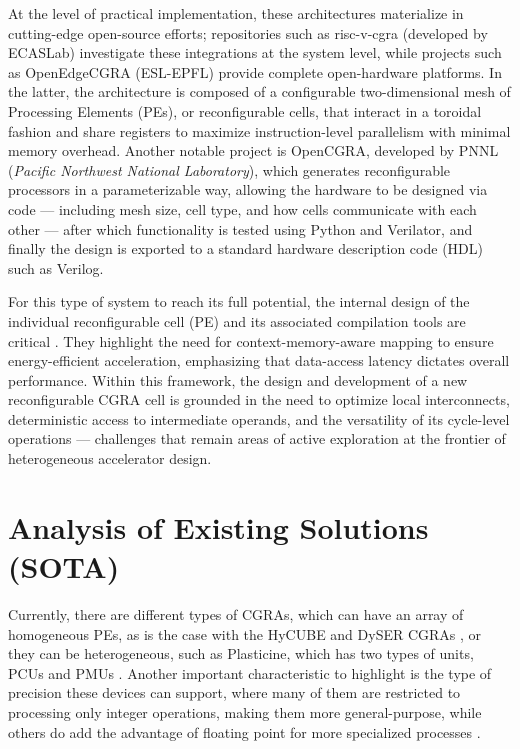 \documentclass[conference]{IEEEtran}
\begin{document}
At the level of practical implementation, these architectures materialize in cutting-edge open-source efforts; repositories such as risc-v-cgra (developed by ECASLab) investigate these integrations at the system level, while projects such as OpenEdgeCGRA (ESL-EPFL) provide complete open-hardware platforms. In the latter, the architecture is composed of a configurable two-dimensional mesh of Processing Elements (PEs), or reconfigurable cells, that interact in a toroidal fashion and share registers to maximize instruction-level parallelism with minimal memory overhead. Another notable project is OpenCGRA, developed by PNNL (\textit{Pacific Northwest National Laboratory}), which generates reconfigurable processors in a parameterizable way, allowing the hardware to be designed via code — including mesh size, cell type, and how cells communicate with each other — after which functionality is tested using Python and Verilator, and finally the design is exported to a standard hardware description code (HDL) such as Verilog.

For this type of system to reach its full potential, the internal design of the individual reconfigurable cell (PE) and its associated compilation tools are critical \cite{satyajit}. They highlight the need for context-memory-aware mapping to ensure energy-efficient acceleration, emphasizing that data-access latency dictates overall performance. Within this framework, the design and development of a new reconfigurable CGRA cell is grounded in the need to optimize local interconnects, deterministic access to intermediate operands, and the versatility of its cycle-level operations — challenges that remain areas of active exploration at the frontier of heterogeneous accelerator design.


\section{Analysis of Existing Solutions (SOTA)} %
\label{sec:sota}

Currently, there are different types of CGRAs, which can have an array of homogeneous PEs, as is the case with the HyCUBE and DySER CGRAs \cite{Blocks2022}, or they can be heterogeneous, such as Plasticine, which has two types of units, PCUs and PMUs \cite{plasticine2017}. Another important characteristic to highlight is the type of precision these devices can support, where many of them are restricted to processing only integer operations, making them more general-purpose, while others do add the advantage of floating point for more specialized processes \cite{exploration_tradeoffs}.
\end{document}
